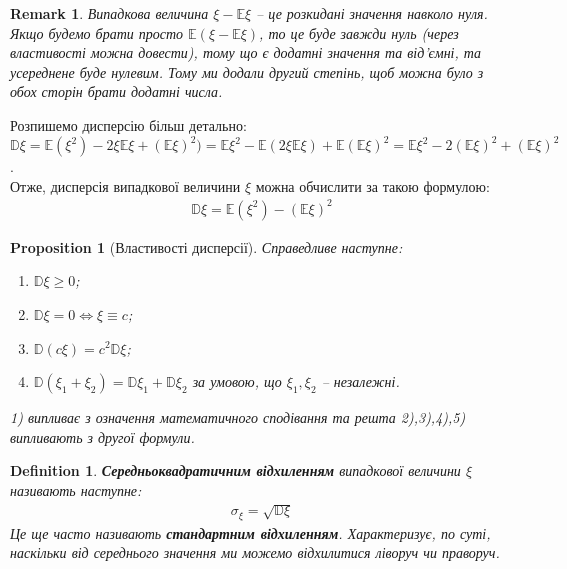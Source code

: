 \documentclass[a4paper, 10pt]{article}
\theoremstyle{theoremdd}
\newtheorem{definition}[theorem]{Definition}
\newtheorem{proposition}[theorem]{Proposition}
\newtheorem{remark}[theorem]{Remark}
\begin{document}
\begin{remark}
Випадкова величина $\xi - \mathbb{E}\xi$ -- це розкидані значення навколо нуля. Якщо будемо брати просто $\mathbb{E}(\xi - \mathbb{E}\xi)$, то це буде завжди нуль (через властивості можна довести), тому що є додатні значення та від'ємні, та усереднене буде нулевим. Тому ми додали другий степінь, щоб можна було з обох сторін брати додатні числа.
\end{remark}
\noindent
Розпишемо дисперсію більш детально:\\
$\mathbb{D}\xi = \mathbb{E}(\xi^2) - 2 \xi \mathbb{E}\xi + (\mathbb{E}\xi)^2) = \mathbb{E} \xi^2 - \mathbb{E}(2 \xi \mathbb{E}\xi) + \mathbb{E}(\mathbb{E}\xi)^2 = \mathbb{E}\xi^2 - 2 (\mathbb{E}\xi)^2 + (\mathbb{E}\xi)^2$.\\
Отже, дисперсія випадкової величини $\xi$ можна обчислити за такою формулою:
\begin{align*}
\mathbb{D}\xi = \mathbb{E}(\xi^2) - (\mathbb{E}\xi)^2
\end{align*}

\begin{proposition}[Властивості дисперсії]
Справедливе наступне:
\begin{enumerate}[nosep,wide=0pt,label={\arabic*)}]
\item $\mathbb{D}\xi \geq 0$;
\item $\mathbb{D}\xi = 0 \iff \xi \equiv c$;
\item $\mathbb{D}(c \xi) = c^2 \mathbb{D}\xi$;
\item $\mathbb{D}(\xi_1 + \xi_2) = \mathbb{D}\xi_1 + \mathbb{D}\xi_2$ за умовою, що $\xi_1,\xi_2$ -- незалежні.
\end{enumerate}
\textit{1) випливає з означення математичного сподівання та решта 2),3),4),5) випливають з другої формули.}
\end{proposition}

\begin{definition}
\textbf{Середньоквадратичним відхиленням} випадкової величини $\xi$ називають наступне:
\begin{align*}
\sigma_\xi = \sqrt{\mathbb{D}\xi}
\end{align*}
Це ще часто називають \textbf{стандартним відхиленням}. Характеризує, по суті, наскільки від середнього значення ми можемо відхилитися ліворуч чи праворуч.
\end{definition}
\end{document}

